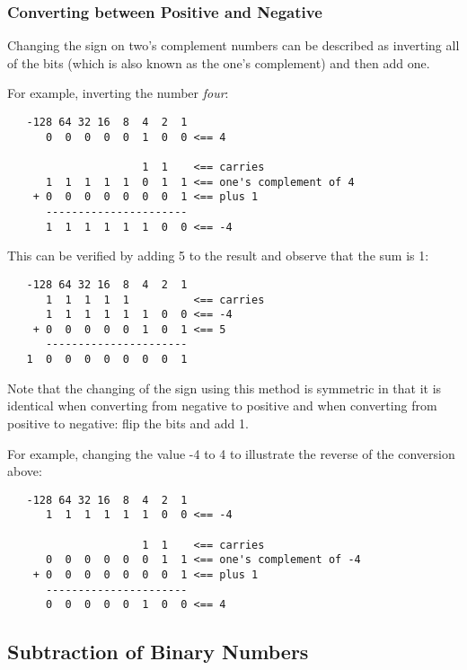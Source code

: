 \subsubsection{Converting between Positive and Negative}

Changing the sign on two's complement numbers can be described as
inverting all of the bits (which is also known as the one's complement)
and then add one.

For example, inverting the number {\em four}:

\begin{verbatim}
   -128 64 32 16  8  4  2  1
      0  0  0  0  0  1  0  0 <== 4

                     1  1    <== carries
      1  1  1  1  1  0  1  1 <== one's complement of 4
    + 0  0  0  0  0  0  0  1 <== plus 1
      ----------------------
      1  1  1  1  1  1  0  0 <== -4
\end{verbatim}

This can be verified by adding 5 to the result and observe that
the sum is 1:

\begin{verbatim}
   -128 64 32 16  8  4  2  1
      1  1  1  1  1          <== carries
      1  1  1  1  1  1  0  0 <== -4
    + 0  0  0  0  0  1  0  1 <== 5
      ----------------------
   1  0  0  0  0  0  0  0  1
\end{verbatim}

Note that the changing of the sign using this method is symmetric
in that it is identical when converting from negative to positive
and when converting from positive to negative: flip the bits and
add 1.

For example, changing the value -4 to 4 to illustrate the
reverse of the conversion above:

\begin{verbatim}
   -128 64 32 16  8  4  2  1
      1  1  1  1  1  1  0  0 <== -4

                     1  1    <== carries
      0  0  0  0  0  0  1  1 <== one's complement of -4
    + 0  0  0  0  0  0  0  1 <== plus 1
      ----------------------
      0  0  0  0  0  1  0  0 <== 4
\end{verbatim}

\subsection{Subtraction of Binary Numbers}


